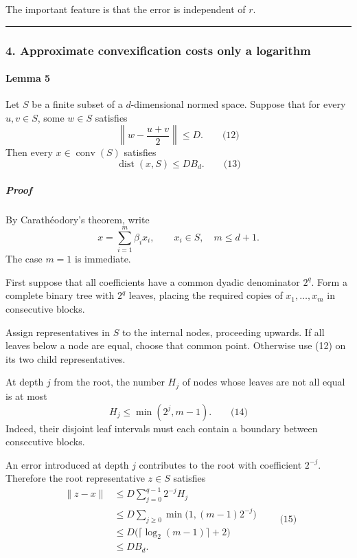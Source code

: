 \documentclass[
  11pt,
  a4paper,
]{article}
\begin{document}
The important feature is that the error is independent of \(r\).

\begin{center}\rule{0.5\linewidth}{0.5pt}\end{center}

\subsubsection{4. Approximate convexification costs only a
logarithm}\label{approximate-convexification-costs-only-a-logarithm}

\paragraph{Lemma 5}\label{lemma-5}

Let \(S\) be a finite subset of a \(d\)-dimensional normed space.
Suppose that for every \(u,v\in S\), some \(w\in S\) satisfies \[
\left\|w-\frac{u+v}{2}\right\|\le D.
\qquad\text{(12)}
\] Then every \(x\in\operatorname{conv}(S)\) satisfies \[
\operatorname{dist}(x,S)\le DB_d.
\qquad\text{(13)}
\]

\subparagraph{Proof}\label{proof-2}

By Carathéodory's theorem, write \[
x=\sum_{i=1}^m\beta_i x_i,
\qquad
x_i\in S,\quad m\le d+1.
\] The case \(m=1\) is immediate.

First suppose that all coefficients have a common dyadic denominator
\(2^q\). Form a complete binary tree with \(2^q\) leaves, placing the
required copies of \(x_1,\ldots,x_m\) in consecutive blocks.

Assign representatives in \(S\) to the internal nodes, proceeding
upwards. If all leaves below a node are equal, choose that common point.
Otherwise use (12) on its two child representatives.

At depth \(j\) from the root, the number \(H_j\) of nodes whose leaves
are not all equal is at most \[
H_j\le \min(2^j,m-1).
\qquad\text{(14)}
\] Indeed, their disjoint leaf intervals must each contain a boundary
between consecutive blocks.

An error introduced at depth \(j\) contributes to the root with
coefficient \(2^{-j}\). Therefore the root representative \(z\in S\)
satisfies \begin{equation*}
\begin{aligned}
\|z-x\|
&\le D\sum_{j=0}^{q-1}2^{-j}H_j\\
&\le D\sum_{j\ge0}\min\bigl(1,(m-1)2^{-j}\bigr)\\
&\le D\bigl(\lceil\log_2(m-1)\rceil+2\bigr)\\
&\le DB_d.
\end{aligned}
\qquad\text{(15)}
\end{equation*}
\end{document}
